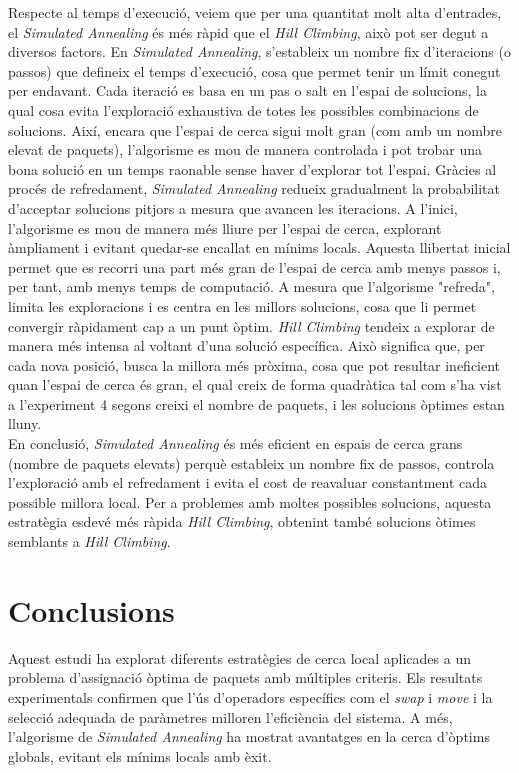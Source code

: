 \documentclass[a4paper]{article}
\begin{document}
	Respecte al temps d'execució, veiem que per una quantitat molt alta d'entrades, el \textit{Simulated Annealing} és més ràpid que el \textit{Hill Climbing}, això pot ser degut a diversos factors. En \textit{Simulated Annealing}, s'estableix un nombre fix d'iteracions (o passos) que defineix el temps d'execució, cosa que permet tenir un límit conegut per endavant. Cada iteració es basa en un pas o salt en l'espai de solucions, la qual cosa evita l'exploració exhaustiva de totes les possibles combinacions de solucions. Així, encara que l'espai de cerca sigui molt gran (com amb un nombre elevat de paquets), l'algorisme es mou de manera controlada i pot trobar una bona solució en un temps raonable sense haver d'explorar tot l'espai.
	Gràcies al procés de refredament, \textit{Simulated Annealing} redueix gradualment la probabilitat d'acceptar solucions pitjors a mesura que avancen les iteracions. A l'inici, l'algorisme es mou de manera més lliure per l'espai de cerca, explorant àmpliament i evitant quedar-se encallat en mínims locals. Aquesta llibertat inicial permet que es recorri una part més gran de l'espai de cerca amb menys passos i, per tant, amb menys temps de computació. A mesura que l'algorisme "refreda", limita les exploracions i es centra en les millors solucions, cosa que li permet convergir ràpidament cap a un punt òptim.
	\textit{Hill Climbing} tendeix a explorar de manera més intensa al voltant d'una solució específica. Això significa que, per cada nova posició, busca la millora més pròxima, cosa que pot resultar ineficient quan l'espai de cerca és gran, el qual creix de forma quadràtica tal com s'ha vist a l'experiment 4 segons creixi el nombre de paquets, i les solucions òptimes estan lluny. \\

	En conclusió, \textit{Simulated Annealing} és més eficient en espais de cerca grans (nombre de paquets elevats) perquè estableix un nombre fix de passos, controla l'exploració amb el refredament i evita el cost de reavaluar constantment cada possible millora local. Per a problemes amb moltes possibles solucions, aquesta estratègia esdevé més ràpida \textit{Hill Climbing}, obtenint també solucions òtimes semblants a \textit{Hill Climbing}.
	
	\newpage
	\section{Conclusions}
	
	Aquest estudi ha explorat diferents estratègies de cerca local aplicades a un problema d'assignació òptima de paquets amb múltiples criteris. Els resultats experimentals confirmen que l'ús d'operadors específics com el \textit{swap} i \textit{move} i la selecció adequada de paràmetres milloren l'eficiència del sistema. A més, l'algorisme de \textit{Simulated Annealing} ha mostrat avantatges en la cerca d'òptims globals, evitant els mínims locals amb èxit. \\
	
\end{document}
